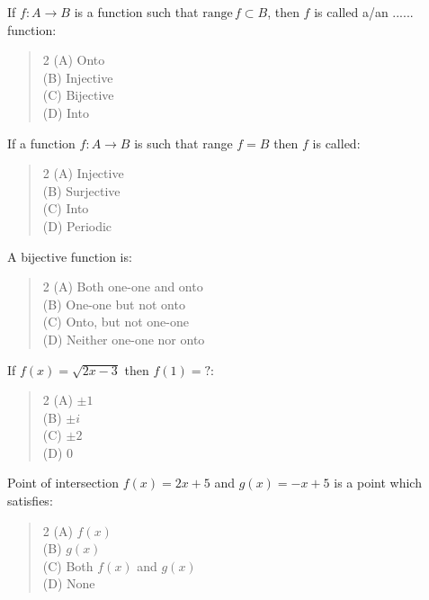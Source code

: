 \documentclass[11pt,a4paper]{article}
\begin{document}
\begin{mcqlist}
\item If $f:A\rightarrow B$ is a function such that $\mathrm{range}\, f \subset B$, then $f$ is called a/an ...... function:
\begin{quote}\begin{multicols}{2}
\noindent (A) Onto \\
(B) Injective \\
(C) Bijective \\
(D) Into
\end{multicols}\end{quote}

\item If a function $f:A\rightarrow B$ is such that range $f=B$ then $f$ is called:
\begin{quote}\begin{multicols}{2}
\noindent (A) Injective \\
(B) Surjective \\
(C) Into \\
(D) Periodic
\end{multicols}\end{quote}

\item A bijective function is:
\begin{quote}\begin{multicols}{2}
\noindent (A) Both one-one and onto \\
(B) One-one but not onto \\
(C) Onto, but not one-one \\
(D) Neither one-one nor onto
\end{multicols}\end{quote}

\item If $f(x)=\sqrt{2x-3}$ then $f(1)=?$:
\begin{quote}\begin{multicols}{2}
\noindent (A) $\pm1$ \\
(B) $\pm i$ \\
(C) $\pm2$ \\
(D) $0$
\end{multicols}\end{quote}

\item Point of intersection $f(x)=2x+5$ and $g(x)=-x+5$ is a point which satisfies:
\begin{quote}\begin{multicols}{2}
\noindent (A) $f(x)$ \\
(B) $g(x)$ \\
(C) Both $f(x)$ and $g(x)$ \\
(D) None
\end{multicols}\end{quote}


\end{mcqlist}
\end{document}
